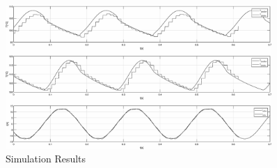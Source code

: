 \begin{figure}[!h]
\centering
\includegraphics[width=0.9\textwidth]{figures/homerseklet}
\caption{Simulation Results}
\label{fig:fig_sim}
\end{figure}


%
%



